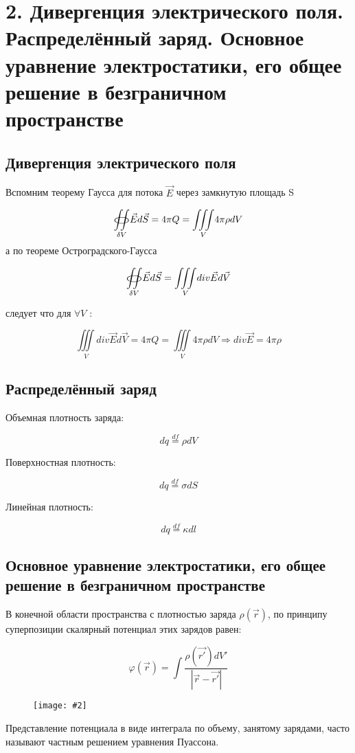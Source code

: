 \documentclass[a4paper,12pt]{article}
\newcommand{\fc}[1]{\[#1\]}
\newcommand{\oiint}{%
  \mathchoice%
    {\mathop{\raisebox{0.1ex}{\scalebox{1.7}[0.7]{\(\bigcirc\)}}}%
     \!\!\!\!\!\!\!\!\!\!\!\int\!\!\!\int}%
    {\mathop{\raisebox{0.3ex}{\scalebox{1.}[0.5]{\(\bigcirc\)}}}%
     \!\!\!\!\!\!\!\int\!\!\!\int}%
    {\mathop{\raisebox{0.1ex}{\scalebox{1}[0.8]{\(\bigcirc\)}}}%
     \!\!\!\!\!\!\!\!\!\int\!\!\!\int}%
    {\mathop{\raisebox{0.05ex}{\scalebox{0.8}[0.8]{\(\bigcirc\)}}}%
     \!\!\!\!\!\!\!\!\int\!\!\!\int}%
}
\newcommand{\imc}[2][0.7\textwidth]{%
    \begin{figure}[h!]
        \centering
        \texttt{[image: \#2]}
    \end{figure}%
}
\begin{document}
\newpage


\section*{2. Дивергенция электрического поля. Распределённый заряд. Основное
уравнение электростатики, его общее решение в безграничном пространстве}

\subsection*{Дивергенция электрического поля}

Вспомним теорему Гаусса для потока $\vec{E}$ через замкнутую площадь S

\fc{\underset{\delta V}{\oiint}\vec{E}d\vec{S}=4\pi Q= \underset{V}{\iiint}
4\pi \rho dV }
а по теореме Остроградского-Гаусса 

\fc{\underset{\delta V}{\oiint}\vec{E}d\vec{S}=\underset{V}{\iiint}div
\vec{E}d\vec{V}}

следует что для $ \forall V$ :

\fc{\underset{V}{\iiint}div \vec{E}d\vec{V}=4\pi Q= \underset{V}{\iiint} 4\pi
\rho dV\Rightarrow div\vec{E}=4\pi \rho}  

\subsection*{Распределённый заряд}

Объемная плотность заряда: 

\fc{dq\overset{df}{=}\rho dV}

Поверхностная плотность:

\fc{dq\overset{df}{=}\sigma dS}

Линейная плотность:

\fc{dq\overset{df}{=}\kappa dl}

\subsection*{Основное
уравнение электростатики, его общее решение в безграничном пространстве}

В конечной области пространства с плотностью заряда $\rho(\vec{r})$, по
принципу суперпозиции скалярный потенциал этих зарядов равен:

\fc{\varphi (\vec{r})=\int \frac{\rho(\vec{r'})dV'}{|\vec{r}-\vec{r'}|}}

\imc[0.5\textwidth]{4.png} 

Представление потенциала в виде интеграла по объему, занятому зарядами, часто
называют частным решением уравнения Пуассона.
\end{document}
